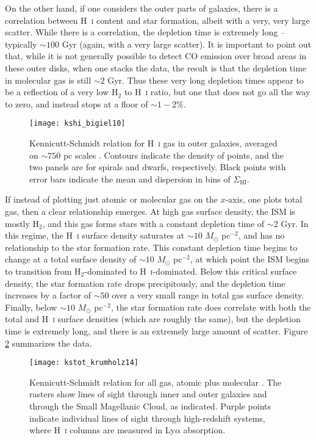 On the other hand, if one considers the outer parts of galaxies, there is a correlation between H~\textsc{i} content and star formation, albeit with a very, very large scatter. While there is a correlation, the depletion time is extremely long -- typically $\sim 100$ Gyr (again, with a very large scatter). It is important to point out that, while it is not generally possible to detect CO emission over broad areas in these outer disks, when one stacks the data, the result is that the depletion time in molecular gas is still $\sim 2$ Gyr. Thus these very long depletion times appear to be a reflection of a very low H$_2$ to H~\textsc{i} ratio, but one that does not go all the way to zero, and instead stops at a floor of $\sim 1-2\%$.

\begin{figure}
\texttt{[image: kshi\_bigiel10]}
\caption[Kennicutt-Schmidt relation for H~\textsc{i} gas in outer galaxies]{
\label{fig:kshi_bigiel10}
Kennicutt-Schmidt relation for H~\textsc{i} gas in outer galaxies, averaged on $\sim 750$ pc scales \citet{bigiel10a}. Contours indicate the density of points, and the two panels are for spirals and dwarfs, respectively. Black points with error bars indicate the mean and dispersion in bins of $\Sigma_{\mathrm{HI}}$.
}
\end{figure}

If instead of plotting just atomic or molecular gas on the $x$-axis, one plots total gas, then a clear relationship emerges. At high gas surface density, the ISM is mostly H$_2$, and this gas forms stars with a constant depletion time of $\sim 2$ Gyr. In this regime, the H~\textsc{i} surface density saturates at $\sim 10$ $M_\odot$ pc$^{-2}$, and has no relationship to the star formation rate. This constant depletion time begins to change at a total surface density of $\sim 10$ $M_\odot$ pc$^{-2}$, at which point the ISM begins to transition from H$_2$-dominated to H~\textsc{i}-dominated. Below this critical surface density, the star formation rate drops precipitously, and the depletion time increases by a factor of $\sim 50$ over a very small range in total gas surface density. Finally, below $\sim 10$ $M_\odot$ pc$^{-2}$, the star formation rate does correlate with both the total and H~\textsc{i} surface densities (which are roughly the same), but the depletion time is extremely long, and there is an extremely large amount of scatter. Figure \ref{fig:kstot_krumholz14} summarizes the data.

\begin{figure}
\texttt{[image: kstot\_krumholz14]}
\caption[Kennicutt-Schmidt relation for total gas in resolved galaxies]{
\label{fig:kstot_krumholz14}
Kennicutt-Schmidt relation for all gas, atomic plus molecular \citet{krumholz14c}. The rasters show lines of sight through inner and outer galaxies and through the Small Magellanic Cloud, as indicated. Purple points indicate individual lines of sight through high-redshift systems, where H~\textsc{i} columns are measured in Ly$\alpha$ absorption.
}
\end{figure}


